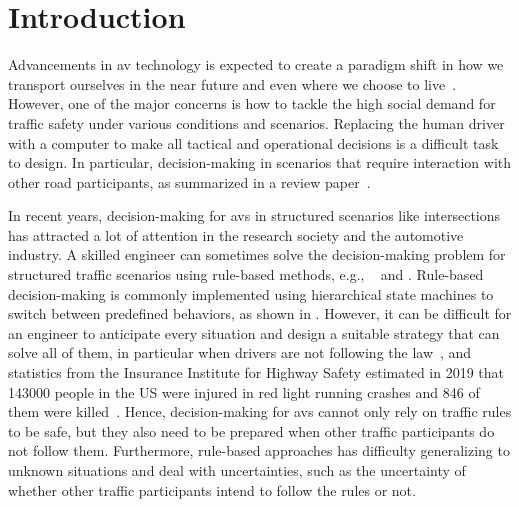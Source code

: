 \section{Introduction}
Advancements in \gls{av} technology is expected to create a paradigm shift in how we transport ourselves in the near future and even where we choose to live~\cite{McKinsey2023}. However, one of the major concerns is how to tackle the high social demand for traffic safety under various conditions and scenarios. 
Replacing the human driver with a computer to make all tactical and operational decisions is a difficult task to design. In particular, decision-making in scenarios that require interaction with other road participants, as summarized in a review paper~\cite{Schwarting2018}.

In recent years, decision-making for \gls{av}s in structured scenarios like intersections has attracted a lot of attention in the research society and the automotive industry. A skilled engineer can sometimes solve the decision-making problem for structured traffic scenarios using rule-based methods, e.g., ~\cite{Fletcher2008} and \cite{darpa2008}. Rule-based decision-making is commonly implemented using hierarchical state machines to switch between predefined behaviors, as shown in \cite{Fletcher2008}. However, it can be difficult for an engineer to anticipate every situation and design a suitable strategy that can solve all of them, in particular when drivers are not following the law~\cite{Althoff2021}, and statistics from the Insurance Institute for Highway Safety estimated in \num{2019} that \num{143000} people in the US were injured in red light running crashes and \num{846} of them were killed~\cite{IIHS2019}. 
Hence, decision-making for \gls{av}s cannot only rely on traffic rules to be safe, but they also need to be prepared when other traffic participants do not follow them. Furthermore, rule-based approaches has difficulty generalizing to unknown situations and deal with uncertainties, such as the uncertainty of whether other traffic participants intend to follow the rules or not.

